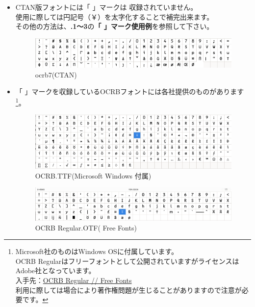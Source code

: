 \documentclass[a4paper,10pt,titlepage,pdfusetitle]{ltjsarticle}
\def\colH#1{\color[HTML]{#1}}
\def\bf#1{\textbf{#1}}
\begin{document}
{\begin{itemize}

  \item CTAN版フォントには「{ }」マークは 収録されていません。\\使用に際しては{\colH{800000}円記号（￥）を太字化}することで補完出来ます。\\
その他の方法は、\bf{.1〜3}の\bf{「{ }」マーク使用例}を参照して下さい。
  
\vspace{-2mm}
\begin{figure}[H]
\centering
\includegraphics[width=14cm]{./images/ocrb-ttf01.png}
\caption{ocrb7(CTAN)} 
\end{figure}
\vspace{-6mm}

  \item 「{ }」マークを収録しているOCRBフォントには各社提供のものがあります\footnote{Microsoft社のものはWindows OSに付属しています。\\OCRB Regularはフリーフォントとして公開されていますがライセンスはAdobe社となっています。\\入手先：\href{https://freefonts.co/fonts/ocrb-regular}{OCRB Regular // Free Fonts}\\利用に際しては場合により著作権問題が生じることがありますので注意が必要です。}。

\vspace{-2mm}
  
\begin{figure}[H]
\centering
\includegraphics[width=14cm]{./images/ocrb-ttf-ms2.png}
\caption{OCRB.TTF(Microsoft Windows 付属)} 
\end{figure}
\vspace{-6mm}

\begin{figure}[H]
\centering
\includegraphics[width=14cm]{./images/ocrb-regular02.png}
\caption{OCRB Regular.OTF( Free Fonts)} 
\end{figure}


\end{itemize}}
\end{document}
